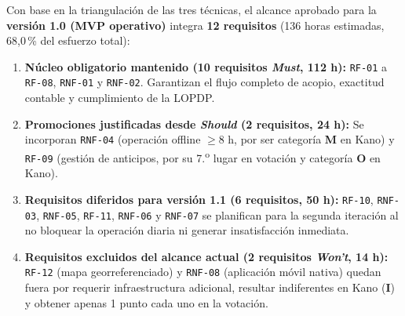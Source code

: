 Con base en la triangulaci\'on de las tres t\'ecnicas, el alcance aprobado para la \textbf{versi\'on 1.0 (MVP operativo)} integra \textbf{12 requisitos} (136 horas estimadas, 68,0\,\% del esfuerzo total):

\begin{enumerate}[leftmargin=18pt,itemsep=2pt]
    \item \textbf{N\'ucleo obligatorio mantenido (10 requisitos \textit{Must}, 112 h):} \texttt{RF-01} a \texttt{RF-08}, \texttt{RNF-01} y \texttt{RNF-02}. Garantizan el flujo completo de acopio, exactitud contable y cumplimiento de la LOPDP.
    \item \textbf{Promociones justificadas desde \textit{Should} (2 requisitos, 24 h):} Se incorporan \texttt{RNF-04} (operaci\'on offline $\ge 8$ h, por ser categor\'ia \textbf{M} en Kano) y \texttt{RF-09} (gesti\'on de anticipos, por su 7.\textsuperscript{o} lugar en votaci\'on y categor\'ia \textbf{O} en Kano).
    \item \textbf{Requisitos diferidos para versi\'on 1.1 (6 requisitos, 50 h):} \texttt{RF-10}, \texttt{RNF-03}, \texttt{RNF-05}, \texttt{RF-11}, \texttt{RNF-06} y \texttt{RNF-07} se planifican para la segunda iteraci\'on al no bloquear la operaci\'on diaria ni generar insatisfacci\'on inmediata.
    \item \textbf{Requisitos excluidos del alcance actual (2 requisitos \textit{Won't}, 14 h):} \texttt{RF-12} (mapa georreferenciado) y \texttt{RNF-08} (aplicaci\'on m\'ovil nativa) quedan fuera por requerir infraestructura adicional, resultar indiferentes en Kano (\textbf{I}) y obtener apenas 1 punto cada uno en la votaci\'on.
\end{enumerate}
